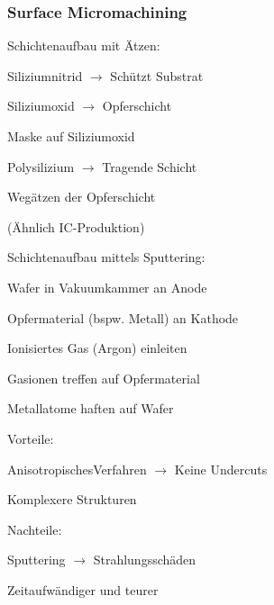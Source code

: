 \subsubsection{Surface Micromachining}
	\begin{minipage}{0.4\textwidth}
      \begin{compactitem}
        \item Schichtenaufbau mit Ätzen:
        \begin{compactitem}
            \item Siliziumnitrid $\rightarrow$ Schützt Substrat
            \item Siliziumoxid $\rightarrow$ Opferschicht
            \item Maske auf Siliziumoxid
            \item Polysilizium  $\rightarrow$ Tragende Schicht
            \item Wegätzen der Opferschicht
            \item (Ähnlich IC-Produktion)
        \end{compactitem}
      \end{compactitem}

	  \begin{compactitem}
	    \item Schichtenaufbau mittels Sputtering:
        \begin{compactitem}
            \item Wafer in Vakuumkammer an Anode
            \item Opfermaterial (bspw. Metall) an Kathode
            \item Ionisiertes Gas (Argon) einleiten
            \item Gasionen treffen auf Opfermaterial
            \item Metallatome haften auf Wafer
        \end{compactitem}
      \end{compactitem}  
      \begin{compactitem}
        \item Vorteile:
        \begin{compactitem}
          \item AnisotropischesVerfahren $\rightarrow$ Keine Undercuts
          \item Komplexere Strukturen
        \end{compactitem}
        \item Nachteile:
          \begin{compactitem}
            \item Sputtering $\rightarrow$ Strahlungsschäden
            \item Zeitaufwändiger und teurer
          \end{compactitem}
      \end{compactitem}
    \end{minipage}
